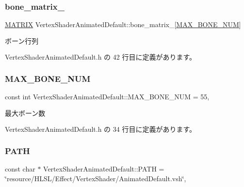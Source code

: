 \subsubsection{\texorpdfstring{bone\+\_\+matrix\+\_\+}{bone\_matrix\_}}
{\footnotesize\ttfamily \mbox{\hyperlink{_matrix_8h_a032295cd9fb1b711757c90667278e744}{M\+A\+T\+R\+IX}} Vertex\+Shader\+Animated\+Default\+::bone\+\_\+matrix\+\_\+\mbox{[}\mbox{\hyperlink{class_vertex_shader_animated_default_aa703d290c4ce5aa16f8d030fc58bceea}{M\+A\+X\+\_\+\+B\+O\+N\+E\+\_\+\+N\+UM}}\mbox{]}\hspace{0.3cm}{\ttfamily [private]}}



ボーン行列 



 Vertex\+Shader\+Animated\+Default.\+h の 42 行目に定義があります。

\mbox{\label{class_vertex_shader_animated_default_aa703d290c4ce5aa16f8d030fc58bceea}} 
\subsubsection{\texorpdfstring{M\+A\+X\+\_\+\+B\+O\+N\+E\+\_\+\+N\+UM}{MAX\_BONE\_NUM}}
{\footnotesize\ttfamily const int Vertex\+Shader\+Animated\+Default\+::\+M\+A\+X\+\_\+\+B\+O\+N\+E\+\_\+\+N\+UM = 55\hspace{0.3cm}{\ttfamily [static]}, {\ttfamily [private]}}



最大ボーン数 



 Vertex\+Shader\+Animated\+Default.\+h の 34 行目に定義があります。

\mbox{\label{class_vertex_shader_animated_default_a0728252117c1440a94a194d26e5bcce1}} 
\subsubsection{\texorpdfstring{P\+A\+TH}{PATH}}
{\footnotesize\ttfamily const char $\ast$ Vertex\+Shader\+Animated\+Default\+::\+P\+A\+TH = \char`\"{}resource/H\+L\+SL/Effect/Vertex\+Shader/Animated\+Default.\+vsh\char`\"{}\hspace{0.3cm}{\ttfamily [static]}, {\ttfamily [private]}}



